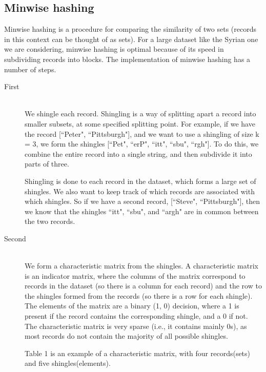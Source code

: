 \documentclass[11pt]{article}
\begin{document}
\subsection{Minwise hashing}

Minwise hashing is a procedure for comparing the similarity of two sets (records in this context can be thought of as sets). For a large dataset like the Syrian one we are considering, minwise hashing is optimal because of its speed in subdividing records into blocks. The implementation of minwise hashing has a number of steps.

\begin{description}
\item[First] \hfill \\
We shingle each record. Shingling is a way of splitting apart a record into smaller subsets, at some specified splitting point. For example, if we have the record [``Peter", ``Pittsburgh"], and we want to use a shingling of size k = 3, we form the shingles [``Pet", ``erP", ``itt", ``sbu", ``rgh"]. To do this, we combine the entire record into a single string, and then subdivide it into parts of three.

Shingling is done to each record in the dataset, which forms a large set of shingles. We also want to keep track of which records are associated with which shingles. So if we have a second record, [``Steve", ``Pittsburgh"], then we know that the shingles ``itt", ``sbu", and ``argh" are in common between the two records.

\item[Second] \hfill \\
We form a characteristic matrix from the shingles. A characteristic matrix is an indicator matrix, where the columns of the matrix correspond to records in the dataset (so there is a column for each record) and the row to the shingles formed from the records (so there is a row for each shingle). The elements of the matrix are a binary (1, 0) decision, where a 1 is present if the record contains the corresponding shingle, and a 0 if not. The characteristic matrix is very sparse (i.e., it contains mainly 0s), as most records do not contain the majority of all possible shingles.

Table 1 is an example of a characteristic matrix, with four records(sets) and five shingles(elements). 


\end{description}
\end{document}
